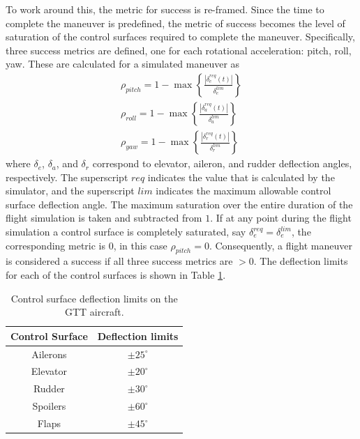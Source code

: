 To work around this, the metric for success is re-framed. 
Since the time to complete the maneuver is predefined, the metric of success becomes the level of saturation of the control surfaces required to complete the maneuver. 
Specifically, three success metrics are defined, one for each rotational acceleration: pitch, roll, yaw. 
These are calculated for a simulated maneuver as
\begin{align}
    \rho_{pitch} = 1- \max\left \{ \frac{\left \vert \delta_e^{req}(t) \right \vert }{\delta_e^{lim}} \right \}
    \\
    \rho_{roll} = 1- \max\left \{ \frac{\left \vert \delta_a^{req}(t) \right \vert }{\delta_a^{lim}} \right \}
    \\
    \rho_{yaw} = 1- \max\left \{ \frac{\left \vert \delta_r^{req}(t) \right \vert }{\delta_r^{lim}} \right \}
\end{align}
where $\delta_e$, $\delta_a$, and $\delta_r$ correspond to elevator, aileron, and rudder deflection angles, respectively.
The superscript $req$ indicates the value that is calculated by the simulator, and the superscript $lim$ indicates the maximum allowable control surface deflection angle. 
The maximum saturation over the entire duration of the flight simulation is taken and subtracted from $1$.
If at any point during the flight simulation a control surface is completely saturated, say $\delta_e^{req} = \delta_e^{lim}$, the corresponding metric is $0$, in this case $\rho_{pitch} = 0$.
Consequently, a flight maneuver is considered a success if all three success metrics are $>0$.
The deflection limits for each of the control surfaces is shown in Table \ref{tab:gtt_defl_limits}.

\begin{table}
\centering
    \renewcommand{\arraystretch}{1.2}
    \captionsetup{justification=centering}
    \caption{Control surface deflection limits on the GTT aircraft.} 
    \begin{tabular}{|c|c|}
    \hline
        Control Surface & Deflection limits \\ \hline
        Ailerons & $\pm 25^\circ$ \\ \hline
        Elevator & $\pm 20^\circ$ \\ \hline
        Rudder & $\pm 30^\circ$ \\ \hline
        Spoilers & $\pm 60^\circ$ \\ \hline
        Flaps & $\pm 45^\circ$ \\ \hline
    \end{tabular}
    \label{tab:gtt_defl_limits}
\end{table}

